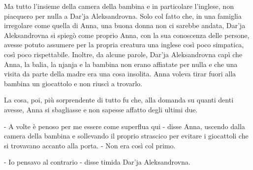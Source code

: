 Ma tutto l'insieme della camera della bambina e in particolare l'inglese, non piacquero per nulla a Dar'ja Aleksandrovna. Solo col fatto che, in una famiglia irregolare come quella di Anna, una buona donna non ci sarebbe andata, Dar'ja Aleksandrovna si spiegò come proprio Anna, con la sua conoscenza delle persone, avesse potuto assumere per la propria creatura una inglese così poco simpatica, così poco rispettabile. Inoltre, da alcune parole, Dar'ja Aleksandrovna capì che Anna, la balia, la njanja e la bambina non erano affiatate per nulla e che una visita da parte della madre era una cosa insolita. Anna voleva tirar fuori alla bambina un giocattolo e non riuscì a trovarlo. 

La cosa, poi, più sorprendente di tutto fu che, alla domanda su quanti denti avesse, Anna si sbagliasse e non sapesse affatto degli ultimi due. 

- A volte è penoso per me essere come superflua qui - disse Anna, uscendo dalla camera della bambina e sollevando il proprio strascico per evitare i giocattoli che si trovavano accanto alla porta. - Non era così col primo. 
\enlargethispage{\baselineskip}

- Io pensavo al contrario - disse timida Dar'ja Aleksandrovna. 

